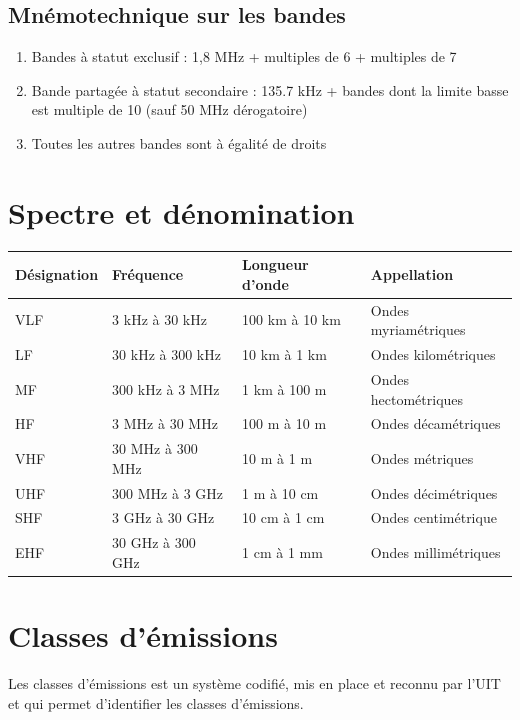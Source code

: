 \documentclass[a4paper,12pt,oneside]{report} %
\begin{document}
		\subsection{Mnémotechnique sur les bandes}
		\begin{enumerate}
			\item Bandes à statut exclusif : 1,8 MHz + multiples de 6 + multiples de 7
			\item Bande partagée à statut secondaire : 135.7 kHz + bandes dont la limite basse est multiple de 10 (sauf 50 MHz dérogatoire)
			\item Toutes les autres bandes sont à égalité de droits
		\end{enumerate}
		
		\section{Spectre et dénomination}
			\begin{center}
			\begin{longtable}{|L{2cm}|L{3.5cm}|L{3.5cm}|L{4.5cm}|}
				\hline
				Désignation & Fréquence & Longueur d'onde & Appellation \tabularnewline
				\hline
				VLF & 3 kHz à 30 kHz & 100 km à 10 km & Ondes myriamétriques \tabularnewline
				\hline
				LF & 30 kHz à 300 kHz & 10 km à 1 km & Ondes kilométriques \tabularnewline
				\hline
				MF & 300 kHz à 3 MHz & 1 km à 100 m & Ondes hectométriques \tabularnewline
				\hline
				HF & 3 MHz à 30 MHz & 100 m à 10 m & Ondes décamétriques \tabularnewline
				\hline
				VHF & 30 MHz à 300 MHz & 10 m à 1 m & Ondes métriques \tabularnewline
				\hline
				UHF & 300 MHz à 3 GHz & 1 m à 10 cm & Ondes décimétriques \tabularnewline
				\hline
				SHF & 3 GHz à 30 GHz & 10 cm à 1 cm & Ondes centimétrique \tabularnewline
				\hline
				EHF & 30 GHz à 300 GHz & 1 cm à 1 mm & Ondes millimétriques \tabularnewline
				\hline
			
			\end{longtable}
			\end{center}
			
		\section{Classes d'émissions}
		Les classes d'émissions est un système codifié, mis en place et reconnu par l'UIT et qui permet d'identifier les classes d'émissions.
\end{document}
